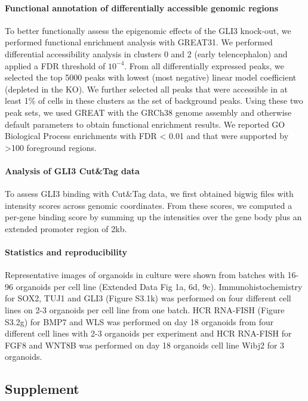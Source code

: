 \paragraph{Functional annotation of differentially accessible genomic regions}
To better functionally assess the epigenomic effects of the GLI3 knock-out, we performed functional enrichment analysis with GREAT31. We performed differential accessibility analysis in clusters 0 and 2 (early telencephalon) and applied a FDR threshold of $10^{-4}$. From all differentially expressed peaks, we selected the top 5000 peaks with lowest (most negative) linear model coefficient (depleted in the KO). We further selected all peaks that were accessible in at least 1\% of cells in these clusters as the set of background peaks. Using these two peak sets, we used GREAT with the GRCh38 genome assembly and otherwise default parameters to obtain functional enrichment results. We reported GO Biological Process enrichments with FDR < 0.01 and that were supported by >100 foreground regions.
 
\paragraph{Analysis of GLI3 Cut\&Tag data}
To assess GLI3 binding with Cut\&Tag data, we first obtained bigwig files with intensity scores across genomic coordinates. From these scores, we computed a per-gene binding score by summing up the intensities over the gene body plus an extended promoter region of 2kb.
 
\paragraph{Statistics and reproducibility}
Representative images of organoids in culture were shown from batches with 16-96 organoids per cell line (Extended Data Fig 1a, 6d, 9c). Immunohistochemistry for SOX2, TUJ1 and GLI3 (Figure S3.1k) was performed on four different cell lines on 2-3 organoids per cell line from one batch. HCR RNA-FISH (Figure S3.2g) for BMP7 and WLS was performed on day 18 organoids from four different cell lines with 2-3 organoids per experiment and HCR RNA-FISH for FGF8 and WNT8B was performed on day 18 organoids cell line Wibj2 for 3 organoids.

\clearpage

\subsection{Supplement}
\beginsupplement

